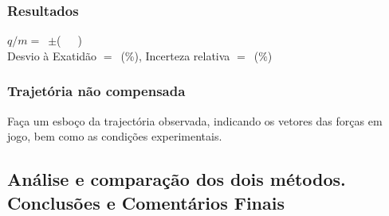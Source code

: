 \documentclass[a4paper,12pt]{article}  %
\begin{document}
\subsubsection{\sf Resultados}
\noindent  $q/m =$~\underline{\makebox[1.5cm][r]{~}}$\pm$\underline{\makebox[1cm][r]{~}}(~~~)\\


\noindent  Desvio à Exatidão $=$~\underline{\makebox[1cm][r]{~}}(\%), 
Incerteza relativa $=$~\underline{\makebox[1cm][r]{~}}($\%$) 



\subsubsection{\sf Trajetória não compensada}
Faça um esboço da trajectória observada, indicando os vetores das forças em jogo, bem como as condições experimentais.
\begin{center}
\framebox[18cm]{\rule{0pt}{6.5cm}}
\end{center}

\subsection{\sf Análise e comparação dos dois métodos. Conclusões e Comentários Finais}
\noindent\underline{\makebox[\textwidth][r]{~}} \\
\noindent\underline{\makebox[\textwidth][r]{~}} \\
\noindent\underline{\makebox[\textwidth][r]{~}} \\
\noindent\underline{\makebox[\textwidth][r]{~}} \\
\noindent\underline{\makebox[\textwidth][r]{~}} \\
\noindent\underline{\makebox[\textwidth][r]{~}} \\
\noindent\underline{\makebox[\textwidth][r]{~}} \\
\noindent\underline{\makebox[\textwidth][r]{~}} \\
\noindent\underline{\makebox[\textwidth][r]{~}} \\
\noindent\underline{\makebox[\textwidth][r]{~}} \\
\noindent\underline{\makebox[\textwidth][r]{~}} \\
\noindent\underline{\makebox[\textwidth][r]{~}} \\
\noindent\underline{\makebox[17cm][r]{~}} \\



\end{document}
